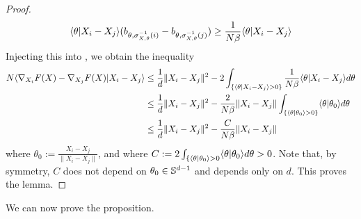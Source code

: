 \begin{proof}
\begin{equation}
        \langle\theta|X_i - X_j\rangle(b_{\theta,\sigma^{-1}_{X,\theta}(i)} - b_{\theta,\sigma^{-1}_{X,\theta}(j)}) \geq \frac{1}{N \beta}\langle\theta|X_i - X_j\rangle
    \end{equation}
    Injecting this into , we obtain the inequality
    \begin{align}
        N\langle\nabla_{X_i}F(X) - \nabla_{X_j}F(X)|X_i - X_j\rangle &\leq \frac{1}{d} \|X_i - X_j\|^2 - 2\int_{\{\langle\theta|X_i - X_j\rangle > 0\}} \frac{1}{N \beta}\langle\theta|X_i - X_j\rangle d\theta \\
        &\leq \frac{1}{d} \|X_i - X_j\|^2 - \frac{2}{N\beta}\|X_i - X_j\|\int_{\{\langle\theta|\theta_0\rangle > 0\}} \langle\theta|\theta_0\rangle d\theta \\
        &\leq \frac{1}{d} \|X_i - X_j\|^2 - \frac{C}{N\beta}\|X_i - X_j\|
    \end{align}
    where $\theta_0 := \frac{X_i - X_j}{\|X_i - X_j\|}$, and where $C := 2\int_{\{\langle\theta|\theta_0\rangle > 0} \langle\theta|\theta_0\rangle d\theta > 0$. Note that, by symmetry, $C$ does not depend on $\theta_0 \in \mathbb S^{d-1}$ and depends only on $d$. This proves the lemma.
\end{proof}

We can now prove the proposition.

